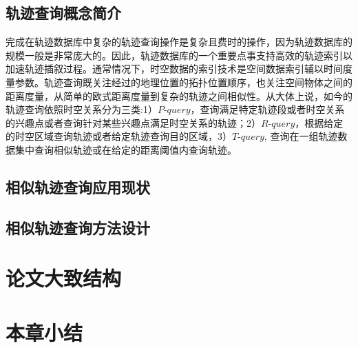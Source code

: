 \subsection{轨迹查询概念简介}
\label{sec:requirements}

完成在轨迹数据库中复杂的轨迹查询操作是复杂且费时的操作，因为轨迹数据库的规模一般是非常庞大的。因此，轨迹数据库的一个重要点事支持高效的轨迹索引以加速轨迹插叙过程。通常情况下，时空数据的索引技术是空间数据索引辅以时间度量参数。轨迹查询既关注经过的地理位置的拓扑位置顺序，也关注空间物体之间的距离度量，从简单的欧式距离度量到复杂的轨迹之间相似性。从大体上说，如今的轨迹查询依照时空关系分为三类:1）$P$-$query$，查询满足特定轨迹段或者时空关系的兴趣点或者查询针对某些兴趣点满足时空关系的轨迹；2）$R$-$query$，根据给定的时空区域查询轨迹或者给定轨迹查询目的区域，3）$T$-$query$, 查询在一组轨迹数据集中查询相似轨迹或在给定的距离阈值内查询轨迹。


\subsection{相似轨迹查询应用现状}
\label{sec:requirements}

\subsection{相似轨迹查询方法设计}
\label{sec:requirements}

\section{论文大致结构}
\label{sec:requirements}

\section{本章小结}
\label{sec:requirements}


